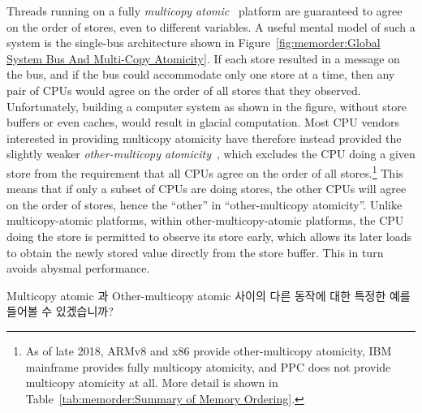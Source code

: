 Threads running on a fully
\emph{multicopy atomic}~\cite{Stone:1995:SP:623262.623912}
platform are guaranteed
to agree on the order of stores, even to different variables.
A useful mental model of such a system is the single-bus architecture
shown in
Figure~\ref{fig:memorder:Global System Bus And Multi-Copy Atomicity}.
If each store resulted in a message on the bus, and if the bus could
accommodate only one store at a time, then any pair of CPUs would
agree on the order of all stores that they observed.
Unfortunately, building a computer system as shown in the figure,
without store buffers or even caches, would result in glacial computation.
Most CPU vendors interested in providing multicopy atomicity have therefore
instead provided the slightly weaker
\emph{other-multicopy atomicity}~\cite[Section B2.3]{ARMv8A:2017},
which excludes the CPU doing a given store from the requirement that all
CPUs agree on the order of all stores.\footnote{
	As of late 2018, ARMv8 and x86 provide other-multicopy atomicity,
	IBM mainframe provides fully multicopy atomicity, and PPC does
	not provide multicopy atomicity at all. More detail is shown in
	Table~\ref{tab:memorder:Summary of Memory Ordering}.}
This means that if only a subset of CPUs are doing stores, the
other CPUs will agree on the order of stores, hence the ``other''
in ``other-multicopy atomicity''.
Unlike multicopy-atomic platforms, within other-multicopy-atomic platforms,
the CPU doing the store is permitted to observe its
store early, which allows its later loads to obtain the newly stored
value directly from the store buffer.
This in turn avoids abysmal performance.
\fi

\QuickQuiz{}
	Multicopy atomic 과 Other-multicopy atomic 사이의 다른 동작에 대한
	특정한 예를 들어볼 수 있겠습니까?
	\iffalse

